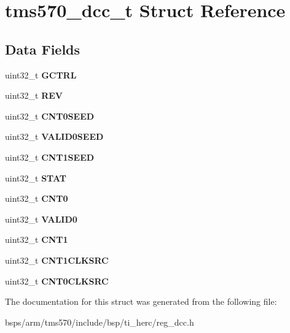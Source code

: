 \hypertarget{structtms570__dcc__t}{}\section{tms570\+\_\+dcc\+\_\+t Struct Reference}
\label{structtms570__dcc__t}
\subsection*{Data Fields}
\begin{DoxyCompactItemize}
\item 
\mbox{\label{structtms570__dcc__t_a6e4a30d6ef88748fcab0a717324f0bdd}} 
uint32\+\_\+t {\bfseries G\+C\+T\+RL}
\item 
\mbox{\label{structtms570__dcc__t_a775df2329c4c0293dbb78c49da713bff}} 
uint32\+\_\+t {\bfseries R\+EV}
\item 
\mbox{\label{structtms570__dcc__t_a14a4abbf01314407a321397e483fb5b7}} 
uint32\+\_\+t {\bfseries C\+N\+T0\+S\+E\+ED}
\item 
\mbox{\label{structtms570__dcc__t_a193c2b498eece70e3b0d27ca292bf173}} 
uint32\+\_\+t {\bfseries V\+A\+L\+I\+D0\+S\+E\+ED}
\item 
\mbox{\label{structtms570__dcc__t_aa7a608744dfe29e5c1c89105614bba9e}} 
uint32\+\_\+t {\bfseries C\+N\+T1\+S\+E\+ED}
\item 
\mbox{\label{structtms570__dcc__t_aed88f997a75101f234c8fafd53e86b7e}} 
uint32\+\_\+t {\bfseries S\+T\+AT}
\item 
\mbox{\label{structtms570__dcc__t_a16ceb3cb03740ccd79c8899e7faadb82}} 
uint32\+\_\+t {\bfseries C\+N\+T0}
\item 
\mbox{\label{structtms570__dcc__t_a53bf12c18a0886b6d04d82c9930e0789}} 
uint32\+\_\+t {\bfseries V\+A\+L\+I\+D0}
\item 
\mbox{\label{structtms570__dcc__t_a38d94cf9511775de3d78e9d9d89125d5}} 
uint32\+\_\+t {\bfseries C\+N\+T1}
\item 
\mbox{\label{structtms570__dcc__t_a0c61fa0ba2f9ca3c11f67f25f233d39a}} 
uint32\+\_\+t {\bfseries C\+N\+T1\+C\+L\+K\+S\+RC}
\item 
\mbox{\label{structtms570__dcc__t_ad543d4e2578621658ecd8790aa03d1d6}} 
uint32\+\_\+t {\bfseries C\+N\+T0\+C\+L\+K\+S\+RC}
\end{DoxyCompactItemize}


The documentation for this struct was generated from the following file\+:\begin{DoxyCompactItemize}
\item 
bsps/arm/tms570/include/bsp/ti\+\_\+herc/reg\+\_\+dcc.\+h\end{DoxyCompactItemize}
